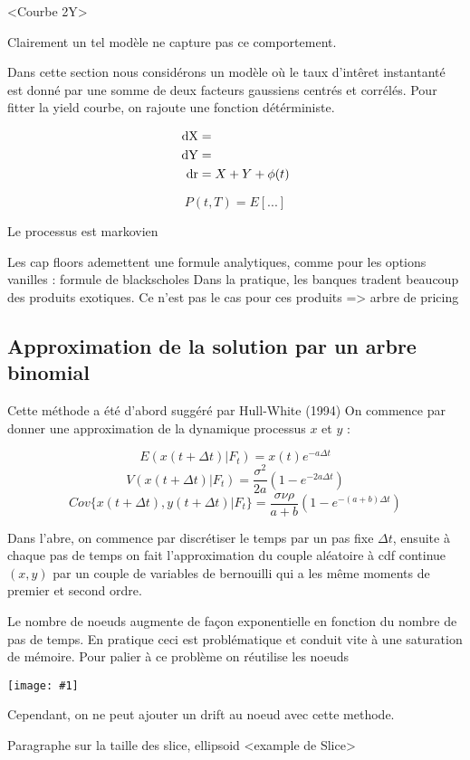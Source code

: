 \documentclass[paper=a4, fontsize=11pt]{scrartcl}
\numberwithin{equation}{section}		%
\numberwithin{figure}{section}			%
\numberwithin{table}{section}				%
\newcommand{\IMG}[3]{
\texttt{[image: \#1]}%
}
\begin{document}
<Courbe 2Y>

Clairement un tel modèle ne capture pas ce comportement.

Dans cette section nous considérons un modèle où le taux d'intêret instantanté est donné par une somme de deux facteurs gaussiens centrés et corrélés. Pour fitter la yield courbe, on rajoute une fonction détérministe.

\begin{align*}
  \rm{d}X &= \\
  \rm{d}Y &= \\
  \rm{d} r &= X + Y + \phi(t)
\end{align*}

$$P(t, T) = E[...]$$

Le processus est markovien

Les cap floors ademettent une formule analytiques, comme pour les options vanilles : formule de blackscholes
Dans la pratique, les banques tradent beaucoup des produits exotiques. Ce n'est pas le cas pour ces produits => arbre de pricing

\subsection{Approximation de la solution par un arbre binomial}

Cette méthode a été d'abord suggéré par Hull-White (1994)
On commence par donner une approximation de la dynamique processus $x$ et $y$ :

$$E(x(t+\Delta t) | F_t) = x(t) e^{-a \Delta t}$$
$$V(x(t+\Delta t) | F_t) = \frac{\sigma^2}{2a} (1 - e^{-2a \Delta t})$$
$$Cov\{x(t+\Delta t), y(t+\Delta t) | F_t \} = \frac{\sigma \nu \rho}{a + b} (1-e^{-(a+b)\Delta t})$$

Dans l'abre, on commence par discrétiser le temps par un pas fixe $\Delta t$, ensuite à chaque pas de temps on fait l'approximation du couple aléatoire à cdf continue $(x, y)$ par un couple de variables de bernouilli qui a les même moments de premier et second ordre.

Le nombre de noeuds augmente de façon exponentielle en fonction du nombre de pas de temps. En pratique ceci est problématique et conduit vite à une saturation de mémoire. Pour palier à ce problème on  réutilise les noeuds


\IMG{img/slice.png}{Slice}{0.5}

Cependant, on ne peut ajouter un drift au noeud avec cette methode.

Paragraphe sur la taille des slice, ellipsoid
<example de Slice>
\end{document}
